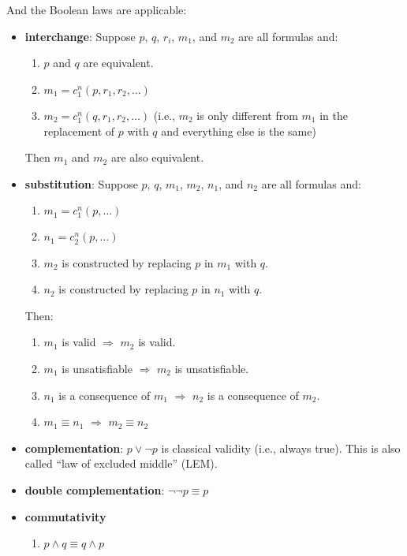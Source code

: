 \documentclass[12pt, letterpaper]{article}
\begin{document}
And the Boolean laws are applicable:
\begin{itemize}
  \item \textbf{interchange}: Suppose $p$, $q$, $r_i$, $m_1$, and $m_2$ are all
        formulas and:
        \begin{enumerate}
          \item $p$ and $q$ are equivalent.
          \item $m_1 = c_1^n(p, r_1, r_2, \ldots)$
          \item $m_2 = c_1^n(q, r_1, r_2, \ldots)$ (i.e., $m_2$ is only different
                from $m_1$ in the replacement of $p$ with $q$ and everything else is
                the same)
        \end{enumerate}
        Then $m_1$ and $m_2$ are also equivalent.
  \item \textbf{substitution}: Suppose $p$, $q$, $m_1$, $m_2$, $n_1$, and $n_2$
        are all formulas and:
        \begin{enumerate}
          \item $m_1 = c_1^n(p, \ldots)$
          \item $n_1 = c_2^n(p, \ldots)$
          \item $m_2$ is constructed by replacing $p$ in $m_1$ with $q$.
          \item $n_2$ is constructed by replacing $p$ in $n_1$ with $q$.
        \end{enumerate}
        Then:
        \begin{enumerate}
          \item $m_1$ is valid $\Rightarrow$ $m_2$ is valid.
          \item $m_1$ is unsatisfiable $\Rightarrow$ $m_2$ is unsatisfiable.
          \item $n_1$ is a consequence of $m_1$ $\Rightarrow$ $n_2$ is a consequence
                of $m_2$.
          \item $m_1 \equiv n_1$ $\Rightarrow$ $m_2 \equiv n_2$
        \end{enumerate}
  \item \textbf{complementation}: $p \lor \lnot p$ is classical validity (i.e.,
        always true). This is also called ``law of excluded middle'' (LEM).
  \item \textbf{double complementation}: $\lnot \lnot p \equiv p$
  \item \textbf{commutativity}
        \begin{enumerate}
          \item $p \land q \equiv q \land p$

\end{enumerate}
\end{itemize}
\end{document}
